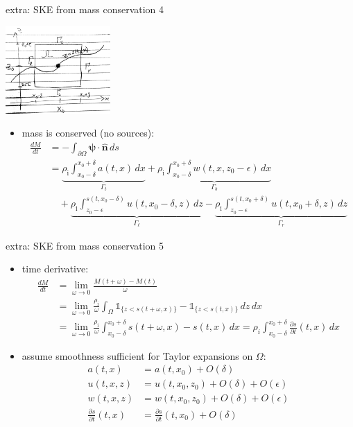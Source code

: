 \documentclass[10pt]{beamer}
\newcommand{\hbn}{\hat{\mathbf{n}}}
\newcommand{\bpsi}{\bm{\psi}}
\newcommand{\eps}{\epsilon}
\newcommand{\rhoi}{\rho_{\text{i}}}
\begin{document}
\begin{frame}{extra: SKE from mass conservation 4}
\begin{center}
\includegraphics[width=0.3\textwidth]{skemassconservation.jpg}
\end{center}

\begin{itemize}
\item mass is conserved (no sources):
\begin{align*}
\frac{dM}{dt} &= - \int_{\partial \Omega} \bpsi \cdot \hbn\,ds \\
  &= \underbrace{\rhoi \int_{x_0-\delta}^{x_0+\delta} a(t,x)\,dx}_{\Gamma_t} + \underbrace{\rhoi \int_{x_0-\delta}^{x_0+\delta} w(t,x,z_0-\eps)\,dx}_{\Gamma_b} \\
  &\quad + \underbrace{\rhoi \int_{z_0-\eps}^{s(t,x_0-\delta)} u(t,x_0-\delta,z)\,dz}_{\Gamma_\ell} - \underbrace{\rhoi \int_{z_0-\eps}^{s(t,x_0+\delta)} u(t,x_0+\delta,z)\,dz}_{\Gamma_r}
\end{align*}

\end{itemize}
\end{frame}

\begin{frame}{extra: SKE from mass conservation 5}

\begin{itemize}
\item time derivative:
\begin{align*}
\frac{dM}{dt} &= \lim_{\omega\to 0} \frac{M(t+\omega) - M(t)}{\omega} \\
    &= \lim_{\omega\to 0} \frac{\rhoi}{\omega} \int_\Omega \mathbb{1}_{\{z<s(t+\omega,x)\}} - \mathbb{1}_{\{z<s(t,x)\}}\,dz\,dx \\
    &= \lim_{\omega\to 0} \frac{\rhoi}{\omega} \int_{x_0-\delta}^{x_0+\delta} s(t+\omega,x) - s(t,x)\,dx = \rho_i \int_{x_0-\delta}^{x_0+\delta} \frac{\partial s}{\partial t}(t,x)\,dx
\end{align*}
\item assume smoothness sufficient for Taylor expansions on $\Omega$:
\begin{align*}
a(t,x) &= a(t,x_0) + O(\delta) \\
u(t,x,z) &= u(t,x_0,z_0) + O(\delta) + O(\eps) \\
w(t,x,z) &= w(t,x_0,z_0) + O(\delta) + O(\eps) \\
\frac{\partial s}{\partial t}(t,x) &= \frac{\partial s}{\partial t}(t,x_0) + O(\delta)
\end{align*}
\end{itemize}
\end{frame}
\end{document}
